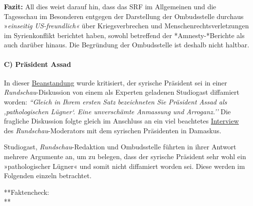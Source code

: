 \textbf{Fazit:} All dies weist darauf hin, dass das SRF im Allgemeinen
und die Tagesschau im Besonderen entgegen der Darstellung der
Ombudsstelle durchaus »\emph{einseitig US-freundlich«} über
Kriegsverbrechen und Menschenrechtsverletzungen im Syrienkonflikt
berichtet haben, sowohl betreffend der *Amnesty-*Berichte als auch
darüber hinaus. Die Begründung der Ombudsstelle ist deshalb nicht
haltbar.

\hypertarget{c-pruxe4sident-assad}{%
\paragraph{C) Präsident Assad}\label{c-pruxe4sident-assad}}

In dieser
\href{https://www.srgd.ch/de/aktuelles/news/2016/11/19/rundschau-sondersendung-zum-assad-interview-beanstandet/}{Beanstandung}
wurde kritisiert, der syrische Präsident sei in einer
\emph{Rundschau}-Diskussion von einem als Experten geladenen Studiogast
diffamiert worden: \emph{``Gleich in Ihrem ersten Satz bezeichneten Sie
Präsident Assad als ‚pathologischen Lügner`. Eine unverschämte Anmassung
und Arroganz.''} Die fragliche Diskussion folgte gleich im Anschluss an
ein viel beachtetes
\href{http://www.srf.ch/news/international/assad-ich-greife-keine-menschen-an-ich-verteidige-sie}{Interview}
des \emph{Rundschau}-Moderators mit dem syrischen Präsidenten in
Damaskus.

Studiogast, \emph{Rundschau}-Redaktion und Ombudsstelle führten in ihrer
Antwort mehrere Argumente an, um zu belegen, dass der syrische Präsident
sehr wohl ein »pathologischer Lügner« und somit nicht diffamiert worden
sei. Diese werden im Folgenden einzeln betrachtet.

**Faktencheck:\\
**

